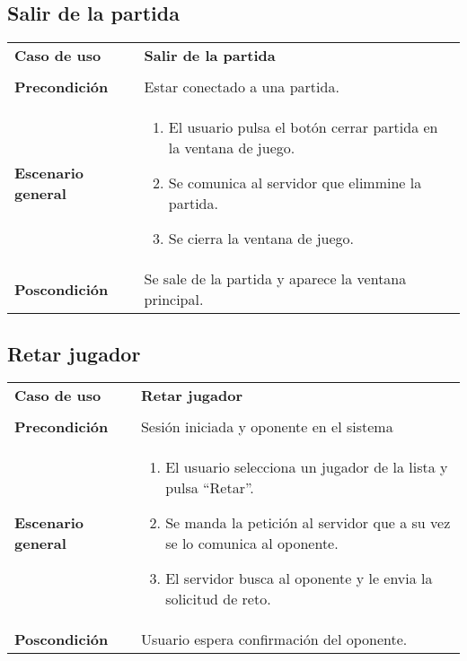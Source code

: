 \subsection{Salir de la partida}
{\footnotesize
\begin{tabularx}{0.95\textwidth}{p{}|X}

\textbf{Caso de uso} &\textbf{Salir de la partida} \\
& \\
\textbf{Precondición} & Estar conectado a una partida.\\

\textbf{Escenario general} & \begin{enumerate}
\item El usuario pulsa el botón cerrar partida en la ventana de juego.
\item Se comunica al servidor que elimmine la partida.
\item Se cierra la ventana de juego.

\end{enumerate} \\

\textbf{Poscondición} & Se sale de la partida y aparece la ventana principal.

\end{tabularx}
}

\subsection{Retar jugador}
{\footnotesize
\begin{tabularx}{0.95\textwidth}{p{}|X}

\textbf{Caso de uso} & \textbf{Retar jugador} \\
& \\
\textbf{Precondición} & Sesión iniciada y oponente en el sistema \\

\textbf{Escenario general} & \begin{enumerate}
\item El usuario selecciona un jugador de la lista y pulsa ``Retar''.
\item Se manda la petición al servidor que a su vez se lo comunica al oponente.
\item El servidor busca al oponente y le envia la solicitud de reto.
\end{enumerate} \\

\textbf{Poscondición} & Usuario espera confirmación del oponente.

\end{tabularx}
}

